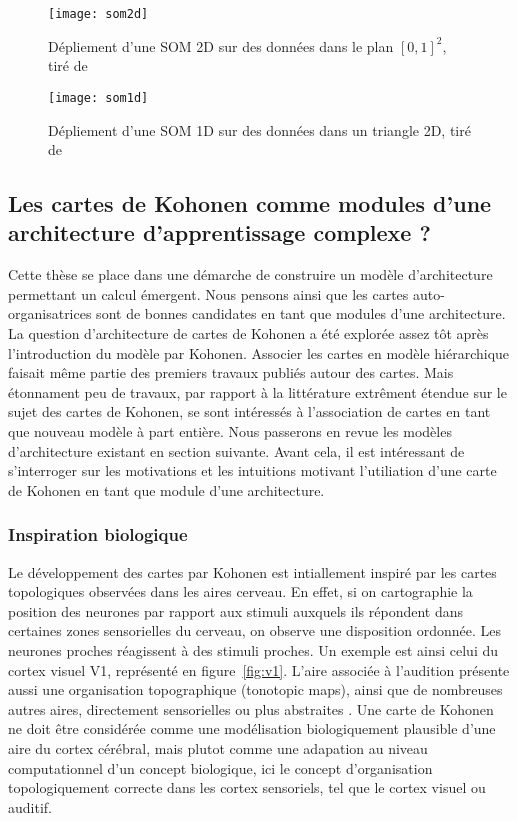 \documentclass[../main]{subfiles}
\begin{document}
\begin{figure}
\centering
\texttt{[image: som2d]}
\caption{Dépliement d'une SOM 2D sur des données dans le plan $[0,1]^2$, tiré de~\cite{Kohonen1995SelfOrganizingM} \label{fig:som2d}}

\end{figure}

\begin{figure}
\centering
\texttt{[image: som1d]}
\caption{Dépliement d'une SOM 1D sur des données dans un triangle 2D, tiré de~\cite{Kohonen1995SelfOrganizingM}\label{fig:som1d}}

\end{figure}



\subsection{Les cartes de Kohonen comme modules d'une architecture d'apprentissage complexe ? }

Cette thèse se place dans une démarche de construire un modèle d'architecture permettant un calcul émergent.
Nous pensons ainsi que les cartes auto-organisatrices sont de bonnes candidates en tant que modules d'une architecture.
La question d'architecture de cartes de Kohonen a été explorée assez tôt après l'introduction du modèle par Kohonen.
Associer les cartes en modèle hiérarchique faisait même partie des premiers travaux publiés autour des cartes.
Mais étonnament peu de travaux, par rapport à la littérature extrêment étendue sur le sujet des cartes de Kohonen, se sont intéressés à l'association de cartes en tant que nouveau modèle à part entière. Nous passerons en revue les modèles d'architecture existant en section suivante. Avant cela, il est intéressant de s'interroger sur les motivations et les intuitions motivant l'utiliation d'une carte de Kohonen en tant que module d'une architecture.

\subsubsection{Inspiration biologique}

Le développement des cartes par Kohonen est intiallement inspiré par les cartes topologiques observées dans les aires cerveau. En effet, si on cartographie la position des neurones par rapport aux stimuli auxquels ils répondent dans certaines zones sensorielles du cerveau, on observe une disposition ordonnée. Les neurones proches réagissent à des stimuli proches. Un exemple est ainsi celui du cortex visuel V1, représenté en figure~\ref{fig:v1}. L'aire associée à l'audition présente aussi une organisation topographique (tonotopic maps), ainsi que de nombreuses autres aires, directement sensorielles ou plus abstraites \cite{Kohonen1995SelfOrganizingM}. 
Une carte de Kohonen ne doit être considérée comme une modélisation biologiquement plausible d'une aire du cortex cérébral, mais plutot comme une adapation au niveau computationnel d'un concept biologique, ici le concept d'organisation topologiquement correcte dans les cortex sensoriels, tel que le cortex visuel ou auditif.
\end{document}
